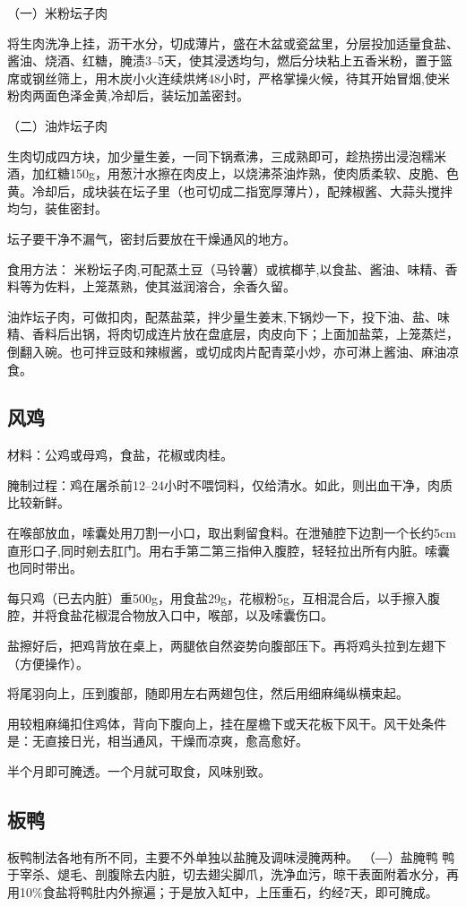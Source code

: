 \documentclass{ctexbook}
\begin{document}
（一）米粉坛子肉

将生肉洗净上挂，沥干水分，切成薄片，盛在木盆或瓷盆里，分层投加适量食盐、酱油、烧酒、红糖，腌渍3--5天，使其浸透均匀，燃后分块粘上五香米粉，置于篮席或钢丝筛上，用木炭小火连续烘烤48小时，严格掌操火候，待其开始冒烟,使米粉肉两面色泽金黄,冷却后，装坛加盖密封。

（二）油炸坛子肉

生肉切成四方块，加少量生姜，一同下锅煮沸，三成熟即可，趁热捞出浸泡糯米酒，加红糖150g，用葱汁水擦在肉皮上，以烧沸茶油炸熟，使肉质柔软、皮脆、色黄。冷却后，成块装在坛子里（也可切成二指宽厚薄片），配辣椒酱、大蒜头搅拌均匀，装隹密封。

坛子要干净不漏气，密封后要放在干燥通风的地方。

食用方法：
米粉坛子肉,可配蒸土豆（马铃薯）或槟榔芋,以食盐、酱油、味精、香料等为佐料，上笼蒸熟，使其滋润溶合，余香久留。

油炸坛子肉，可做扣肉，配蒸盐菜，拌少量生姜末,下锅炒一下，投下油、盐、味精、香料后出锅，将肉切成连片放在盘底层，肉皮向下；上面加盐菜，上笼蒸烂，倒翻入碗。也可拌豆豉和辣椒酱，或切成肉片配青菜小炒，亦可淋上酱油、麻油凉食。
\subsection{风鸡}
材料：公鸡或母鸡，食盐，花椒或肉桂。

腌制过程：鸡在屠杀前12--24小时不喂饲料，仅给清水。如此，则出血干净，肉质比较新鲜。

在喉部放血，嗦囊处用刀割一小口，取出剩留食料。在泄殖腔下边割一个长约5cm直形口子,同时剜去肛门。用右手第二第三指伸入腹腔，轻轻拉出所有内脏。嗦囊也同时带出。

每只鸡（已去内脏）重500g，用食盐29g，花椒粉5g，互相混合后，以手擦入腹腔，并将食盐花椒混合物放入口中，喉部，以及嗦囊伤口。

盐擦好后，把鸡背放在桌上，两腿依自然姿势向腹部压下。再将鸡头拉到左翅下（方便操作）。

将尾羽向上，压到腹部，随即用左右两翅包住，然后用细麻绳纵横束起。

用较粗麻绳扣住鸡体，背向下腹向上，挂在屋檐下或天花板下风干。风干处条件是：无直接日光，相当通风，干燥而凉爽，愈高愈好。

半个月即可腌透。一个月就可取食，风味别致。
\subsection{板鸭}
板鸭制法各地有所不同，主要不外单独以盐腌及调味浸腌两种。
（―）盐腌鸭
鸭于宰杀、煺毛、剖腹除去内脏，切去翅尖脚爪，洗净血污，晾干表面附着水分，再用10\%食盐将鸭肚内外擦遍；于是放入缸中，上压重石，约经7天，即可腌成。
\end{document}
